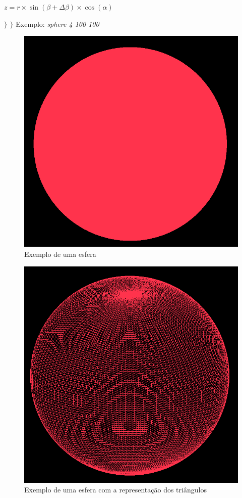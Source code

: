 \documentclass{article}
\begin{document}
\par$z = r\times\sin(\beta + \Delta\beta)\times\cos(\alpha)$ \newline
\par $\}$ \newline
$\}$
\newpage
Exemplo: \textit{sphere 4 100 100}
\begin{figure}[H]
\centering\includegraphics[scale=0.35]{esfera4} 
\caption{\label{fig:controller}Exemplo de uma esfera}
\end{figure} \begin{figure}[H]
\centering\includegraphics[scale=0.35]{esfera3} 
\caption{\label{fig:controller}Exemplo de uma esfera com a representação dos triângulos}
\end{figure}
\end{document}
